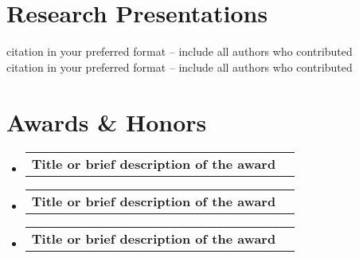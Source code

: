 \documentclass[letterpaper,11pt]{article}
\makeatletter
\newcommand{\resumeSubheading}[4]{
  \vspace{-5pt}\item
    \begin{tabular*}{0.97\textwidth}[t]{l@{\extracolsep{\fill}}r}
      \textbf{#1} & #2 \\
    \end{tabular*}\vspace{-10pt}
}
\newcommand{\resumeSubHeadingListStart}{\vspace{1pt}\begin{itemize}[leftmargin=0.15in, label={}]}
\newcommand{\resumeSubHeadingListEnd}{\end{itemize}}
\makeatother
\begin{document}
%
%
%
%






\section{Research Presentations} 
\begin{itemize}[leftmargin=0.15in, label={}]
    \normalsize{\item{
    {citation in your preferred format -- include all authors who contributed}{} \\
    {citation in your preferred format -- include all authors who contributed}{} 
}}
 \end{itemize}

\section{Awards \& Honors} 
\resumeSubHeadingListStart
    \resumeSubheading
    {Title or brief description of the award}{}
    {University, Sponsor or Organization}{year(s)}
    \resumeSubheading
    {Title or brief description of the award}{}
    {University, Sponsor or Organization}{year(s)}
    \resumeSubheading
    {Title or brief description of the award}{}
    {University, Sponsor or Organization}{year(s)}
\resumeSubHeadingListEnd
\end{document}
